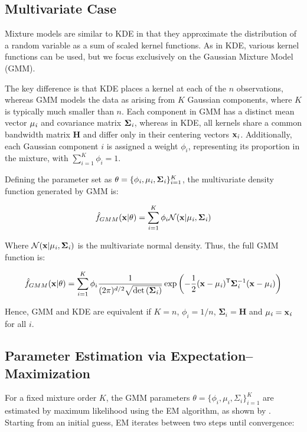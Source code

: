 \subsection{Multivariate Case}
Mixture models are similar to KDE in that they approximate the distribution of a random variable as a sum of scaled kernel functions. As in KDE, various kernel functions can be used, but we focus exclusively on the Gaussian Mixture Model (GMM).

The key difference is that KDE places a kernel at each of the $n$ observations, whereas GMM models the data as arising from $K$ Gaussian components, where $K$ is typically much smaller than $n$. Each component in GMM has a distinct mean vector $\mathbf{\mu_{\it{i}}}$ and covariance matrix $\mathbf{\Sigma_{\it{i}}}$, whereas in KDE, all kernels share a common bandwidth matrix $\mathbf{H}$ and differ only in their centering vectors $\mathbf{x_{\it{i}}}$. Additionally, each Gaussian component $i$ is assigned a weight $\phi_i$, representing its proportion in the mixture, with $\sum_{i=1}^{K}\phi_{i}=1$.

Defining the parameter set as $\mathbf{\theta}=\{ \mathbf{\phi_{\it{i}},\mu_{\it{i}},\mathbf{\Sigma_{\it{i}}}}\}^K_{i=1}$, the multivariate density function generated by GMM is:

$$\displaystyle\hat{f}_{GMM}(\mathbf{x|\theta})=\sum_{i=1}^{K}\phi_{i} \mathcal{N}(\mathbf{x|\mu_{\it{i}},\Sigma_{\it{i}}})$$

Where $\mathcal{N}(\mathbf{x|\mu_{\it{i}},\Sigma_{\it{i}}})$ is the multivariate normal density. Thus, the full GMM function is:

$$\displaystyle\hat{f}_{GMM}(\mathbf{x|\theta})=\sum_{i=1}^{K}\phi_i\frac{1}{(2\pi)^{d/2}\sqrt{\det{(\mathbf{\Sigma_{\it{i}}})}}}\exp\left(-\frac{1}{2}\mathbf{(x-\mu_{\it{i}})^\mathsf{T}\Sigma_{\it{i}}^\mathrm{-1}(x-\mu_{\it{i}})}\right)$$

Hence, GMM and KDE are equivalent if $K=n$, $\phi_{i}=1/n$, $\mathbf{\Sigma}_i=\mathbf{H}$ and $\mathbf{\mu_{\it{i}}=x_{\it{i}}}$ for all $i$.

\subsection{Parameter Estimation via Expectation–Maximization}

For a fixed mixture order $K$, the GMM parameters $\theta = \{\phi_i,\mu_i,\Sigma_i\}_{i=1}^K$ are estimated by maximum likelihood using the EM algorithm, as shown by \cite{rednerMixtureDensitiesMaximum1984}. Starting from an initial guess, EM iterates between two steps until convergence:

